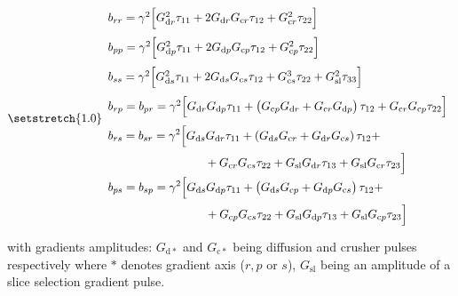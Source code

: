 \begin{equation}\label{eq: bmatrix}
{\setstretch{1.0}
\begin{array}{l}
    b_{rr} = \gamma^2\Bigl[G_{\mathrm{d}r}^2\tau_{11} + 2G_{\mathrm{d}r}G_{\mathrm{c}r}\tau_{12} + G_{\mathrm{c}r}^2\tau_{22}\Bigr]\\[10pt]
    
    b_{pp} = \gamma^2\Bigl[G_{\mathrm{d}p}^2\tau_{11} + 2G_{\mathrm{d}p}G_{\mathrm{c}p}\tau_{12} + G_{\mathrm{c}p}^2\tau_{22} \Bigr]\\[10pt]
    
    b_{ss} = \gamma^2\Bigl[G_{\mathrm{d}s}^2\tau_{11} +2G_{\mathrm{d}s}G_{\mathrm{c}s}\tau_{12} + G_{\mathrm{c}s}^3\tau_{22} + G_{\mathrm{sl}}^2\tau_{33} \Bigr]\\[10pt]
    
    b_{rp} = b_{pr} = \gamma^2\Bigl[G_{\mathrm{d}r}G_{\mathrm{d}p}\tau_{11} + \left(G_{\mathrm{c}p}G_{\mathrm{d}r} + G_{\mathrm{c}r}G_{\mathrm{d}p}\right)\tau_{12} + G_{\mathrm{c}r}G_{\mathrm{c}p}\tau_{22} \Bigr]\\[10pt]
    
    \begin{split}
	b_{rs} &= b_{sr} = \gamma^2\Bigl[G_{\mathrm{d}s}G_{\mathrm{d}r} \tau_{11} + \left( G_{\mathrm{d}s}G_{\mathrm{c}r} + G_{\mathrm{d}r}G_{\mathrm{c}s}\right)\tau_{12} + \\[2pt]
    	 	&\qquad\qquad\qquad\quad  + G_{\mathrm{c}r}G_{\mathrm{c}s}\tau_{22} + G_{\mathrm{sl}}G_{\mathrm{d}r}\tau_{13}+G_{\mathrm{sl}}G_{\mathrm{c}r}\tau_{23}\Bigr]
	\end{split}
    \\[4ex]
    \begin{split}
	b_{ps} &= b_{sp} = \gamma^2 \Bigl[G_{\mathrm{d}s}G_{\mathrm{d}p} \tau_{11} + \left( G_{\mathrm{d}s}G_{\mathrm{c}p} + G_{\mathrm{d}p}G_{\mathrm{c}s}\right)\tau_{12} + \\[2pt]
    	 	&\qquad\qquad\qquad\quad  + G_{\mathrm{c}p}G_{\mathrm{c}s}\tau_{22} + G_{\mathrm{sl}}G_{\mathrm{d}p}\tau_{13}+G_{\mathrm{sl}}G_{\mathrm{c}p}\tau_{23}\Bigr]\\[4pt]
	\end{split}
    \end{array}
}
\end{equation}
with gradients amplitudes: $G_{\mathrm{d}*}$ and $G_{\mathrm{c}*}$ being diffusion and crusher pulses respectively where $*$ denotes gradient axis ($r,p$ or $s$), $G_{\mathrm{sl}}$ being an amplitude of a slice selection gradient pulse. 
